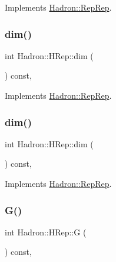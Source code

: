 Implements \mbox{\hyperlink{structHadron_1_1RepRep_a92c8802e5ed7afd7da43ccfd5b7cd92b}{Hadron\+::\+Rep\+Rep}}.

\mbox{\label{structHadron_1_1HRep_a7ed087e9f4edb84e1c537c6c39680b85}} 
\subsubsection{\texorpdfstring{dim()}{dim()}\hspace{0.1cm}{\footnotesize\ttfamily [2/3]}}
{\footnotesize\ttfamily int Hadron\+::\+H\+Rep\+::dim (\begin{DoxyParamCaption}{ }\end{DoxyParamCaption}) const\hspace{0.3cm}{\ttfamily [inline]}, {\ttfamily [virtual]}}



Implements \mbox{\hyperlink{structHadron_1_1RepRep_a92c8802e5ed7afd7da43ccfd5b7cd92b}{Hadron\+::\+Rep\+Rep}}.

\mbox{\label{structHadron_1_1HRep_a7ed087e9f4edb84e1c537c6c39680b85}} 
\subsubsection{\texorpdfstring{dim()}{dim()}\hspace{0.1cm}{\footnotesize\ttfamily [3/3]}}
{\footnotesize\ttfamily int Hadron\+::\+H\+Rep\+::dim (\begin{DoxyParamCaption}{ }\end{DoxyParamCaption}) const\hspace{0.3cm}{\ttfamily [inline]}, {\ttfamily [virtual]}}



Implements \mbox{\hyperlink{structHadron_1_1RepRep_a92c8802e5ed7afd7da43ccfd5b7cd92b}{Hadron\+::\+Rep\+Rep}}.

\mbox{\label{structHadron_1_1HRep_a131ba3bb47daeaf60d4673a2535a5bb2}} 
\subsubsection{\texorpdfstring{G()}{G()}\hspace{0.1cm}{\footnotesize\ttfamily [1/2]}}
{\footnotesize\ttfamily int Hadron\+::\+H\+Rep\+::G (\begin{DoxyParamCaption}{ }\end{DoxyParamCaption}) const\hspace{0.3cm}{\ttfamily [inline]}, {\ttfamily [virtual]}}

